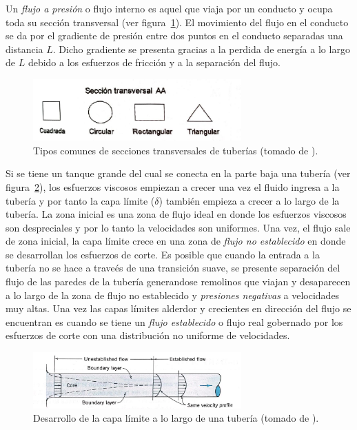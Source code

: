 \documentclass[11pt, oneside]{article}
\begin{document}
Un \emph{flujo a presi\'on} o flujo interno es aquel que viaja por un conducto y ocupa toda su secci\'on transversal (ver figura~\ref{ttub}). El movimiento del flujo en el conducto se da por el gradiente de presi\'on entre dos puntos en el conducto separadas una distancia $L$. Dicho gradiente se presenta gracias a la perdida de energ\'ia a lo largo de $L$ debido a los esfuerzos de fricci\'on y a la separaci\'on del flujo.  

\begin{figure}[h]
\centering
\includegraphics[width=8cm]{ttub.jpeg}
\caption{Tipos comunes de secciones transversales de tuber\'ias (tomado de \cite{agudelo2011mecanica}).}
\label{ttub}
\end{figure}

Si se tiene un tanque grande del cual se conecta en la parte baja una tuber\'ia (ver figura~\ref{cali}), los esfuerzos viscosos empiezan a crecer una vez el fluido ingresa a la tuber\'ia y por tanto la capa l\'imite ($\delta$) tambi\'en empieza a crecer a lo largo de la tuber\'ia. La zona inicial es una zona de flujo ideal en donde los esfuerzos viscosos son despreciales y por lo tanto la velocidades son uniformes. Una vez, el flujo sale de zona inicial, la capa l\'imite crece en una zona de \emph{flujo no establecido} en donde se desarrollan los esfuerzos de corte. Es posible que cuando la entrada a la tuber\'ia no se hace a trave\'es de una transici\'on suave, se presente separaci\'on del flujo de las paredes de la tuber\'ia generandose remolinos que viajan y desaparecen a lo largo de la zona de flujo no establecido y \emph{presiones negativas} a velocidades muy altas. Una vez las capas l\'imites alderdor y crecientes en direcci\'on del flujo se encuentran es cuando se tiene un \emph{flujo establecido} o flujo real gobernado por los esfuerzos de corte con una distribuci\'on no uniforme de velocidades.
  
\begin{figure}[h]
\centering
\includegraphics[width=8cm]{cali.jpeg}
\caption{Desarrollo de la capa l\'imite a lo largo de una tuber\'ia (tomado de \cite{street471elementary}).}
\label{cali}
\end{figure}
\end{document}
